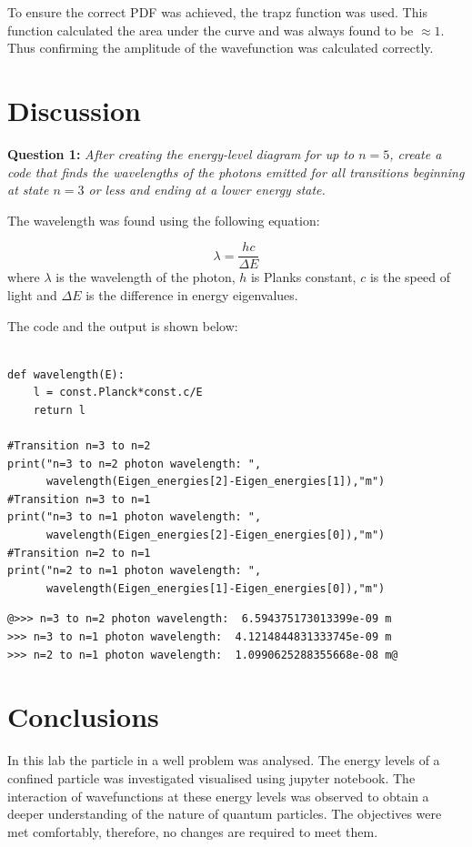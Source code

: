 To ensure the correct PDF was achieved, the trapz function was used. This function calculated the area under the curve and was always found to be $\approx 1$. Thus confirming the amplitude of the wavefunction was calculated correctly. 

\section{Discussion}
\textbf{Question 1:}
\textit{After creating the energy-level diagram for up to $n=5$, create a code that finds the wavelengths of the photons emitted for all transitions beginning at state $n=3$ or less and ending at a lower energy state.}

The wavelength was found using the following equation:

\[\lambda = \frac{hc}{\Delta E}\]
where $\lambda$ is the wavelength of the photon, $h$ is Planks constant, $c$ is the speed of light and $\Delta E$ is the difference in energy eigenvalues.

The code and the output is shown below:

\begin{listing}[H]
\begin{verbatim}

def wavelength(E):
    l = const.Planck*const.c/E
    return l

#Transition n=3 to n=2
print("n=3 to n=2 photon wavelength: ", 
      wavelength(Eigen_energies[2]-Eigen_energies[1]),"m")
#Transition n=3 to n=1
print("n=3 to n=1 photon wavelength: ", 
      wavelength(Eigen_energies[2]-Eigen_energies[0]),"m")
#Transition n=2 to n=1
print("n=2 to n=1 photon wavelength: ", 
      wavelength(Eigen_energies[1]-Eigen_energies[0]),"m")
\end{verbatim}
\end{listing}

\begin{lstlisting}[frame=single,style=base,backgroundcolor=\color{black}, basicstyle=\small]
@>>> n=3 to n=2 photon wavelength:  6.594375173013399e-09 m
>>> n=3 to n=1 photon wavelength:  4.1214844831333745e-09 m
>>> n=2 to n=1 photon wavelength:  1.0990625288355668e-08 m@
\end{lstlisting}


\section{Conclusions}
In this lab the particle in a well problem was analysed. The energy levels of a confined particle was investigated visualised using jupyter notebook. The interaction of wavefunctions at these energy levels was observed to obtain a deeper understanding of the nature of quantum particles. The objectives were met comfortably, therefore, no changes are required to meet them. 